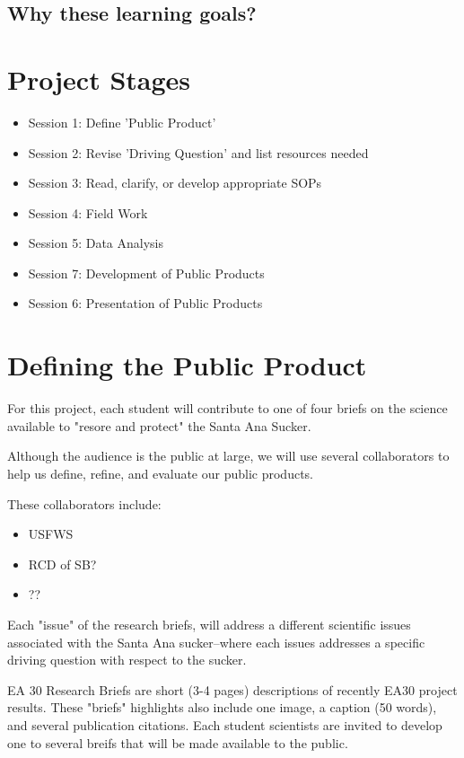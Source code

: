 \documentclass{article}\usepackage[]{graphicx}\usepackage[]{color}
\begin{document}
\subsection{Why these learning goals?}

\section{Project Stages}

\begin{itemize}
  \item Session 1: Define 'Public Product'
  \item Session 2: Revise 'Driving Question' and list resources needed
  \item Session 3: Read, clarify, or develop appropriate SOPs
  \item Session 4: Field Work
  \item Session 5: Data Analysis
  \item Session 7: Development of Public Products
  \item Session 6: Presentation of Public Products
\end{itemize}

\section{Defining the Public Product}

For this project, each student will contribute to one of four briefs on the science available to "resore and protect" the Santa Ana Sucker. 

Although the audience is the public at large, we will use several collaborators to help us define, refine, and evaluate our public products. 

These collaborators include: 

\begin{itemize}
  \item USFWS
  \item RCD of SB?
  \item ??
\end{itemize}

Each "issue" of the research briefs, will address a different scientific issues associated with the Santa Ana sucker--where each issues addresses a specific driving question with respect to the sucker. 

EA 30 Research Briefs are short (3-4 pages) descriptions of recently EA30 project results. These "briefs" highlights also include one image, a caption (50 words), and several publication citations. Each student scientists are invited to develop one to several breifs that will be made available to the public.
\end{document}
